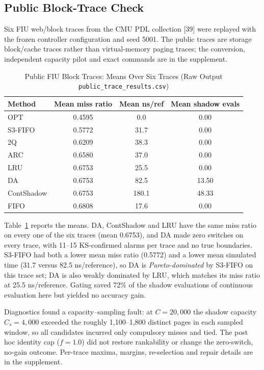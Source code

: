 \documentclass[10pt,twocolumn,a4paper]{IEEEtran}
\begin{document}
\subsection{Public Block-Trace Check}
\label{sec:public}
Six FIU web/block traces from the CMU PDL collection [39] were replayed with
the frozen controller configuration and seed 5001. The public traces are
storage block/cache traces rather than virtual-memory paging traces; the
conversion, independent capacity pilot and exact commands are in the supplement.

\begin{table}[!t]
\caption{Public FIU Block Traces: Means Over Six Traces (Raw Output
\texttt{public\_trace\_results.csv})}
\label{tab:public}
\footnotesize
\setlength{\tabcolsep}{4pt}
\begin{tabular}{@{}lccc@{}}
\toprule
Method & Mean miss ratio & Mean ns/ref & Mean shadow evals \\
\midrule
OPT & 0.4595 & 0.0 & 0.00 \\
S3-FIFO & 0.5772 & 31.7 & 0.00 \\
2Q & 0.6209 & 38.3 & 0.00 \\
ARC & 0.6580 & 37.0 & 0.00 \\
LRU & 0.6753 & 25.5 & 0.00 \\
DA & 0.6753 & 82.5 & 13.50 \\
ContShadow & 0.6753 & 180.1 & 48.33 \\
FIFO & 0.6808 & 17.6 & 0.00 \\
\bottomrule
\end{tabular}
\end{table}

Table~\ref{tab:public} reports the means. DA, ContShadow and LRU have the same
miss ratio on every one of the six traces (mean 0.6753), and DA made zero
switches on every trace, with 11--15 KS-confirmed alarms per trace and no true
boundaries. S3-FIFO had both a lower mean miss ratio (0.5772) and a lower mean
simulated time (31.7 versus 82.5 ns/reference), so DA is \emph{Pareto-dominated}
by S3-FIFO on this trace set; DA is also weakly dominated by LRU, which matches
its miss ratio at 25.5 ns/reference. Gating saved 72\% of the shadow
evaluations of continuous evaluation here but yielded no accuracy gain.

Diagnostics found a capacity--sampling fault: at $C=20{,}000$ the shadow
capacity $C_s=4{,}000$ exceeded the roughly 1,100--1,800 distinct pages in each
sampled window, so all candidates incurred only compulsory misses and tied.
The post hoc identity cap ($f=1.0$) did not restore rankability or change the
zero-switch, no-gain outcome. Per-trace maxima, margins, re-selection and
repair details are in the supplement.
\end{document}
